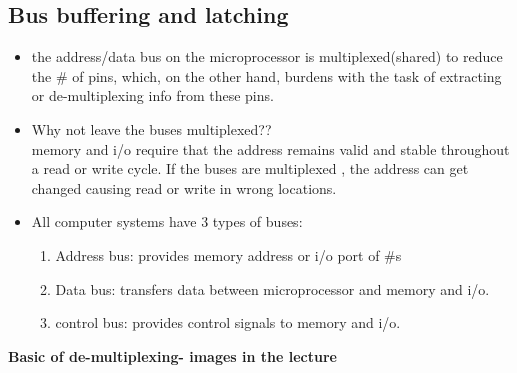 \documentclass[12pt]{article}
\begin{document}
\subsection{Bus buffering and latching}
\begin{itemize}
	\item the address/data bus on the microprocessor is multiplexed(shared) to reduce the \# of pins, which, on the other hand, burdens with the task of extracting or de-multiplexing info from these pins.
	
	\item Why not leave the buses multiplexed??\\
	memory and i/o require that the address remains valid and stable throughout a read or write cycle. If the buses are multiplexed , the address can get changed causing read or write in wrong locations.
	
	\item All computer systems have 3 types of buses:
	\begin{enumerate}
		\item Address bus: provides memory address or i/o port of \#s 
		\item Data bus: transfers data between microprocessor and memory and i/o.
		\item control bus: provides control signals to memory and i/o.
	\end{enumerate}
	
\end{itemize}

\textbf{Basic of de-multiplexing- images in the lecture}

\newpage

\end{document}
